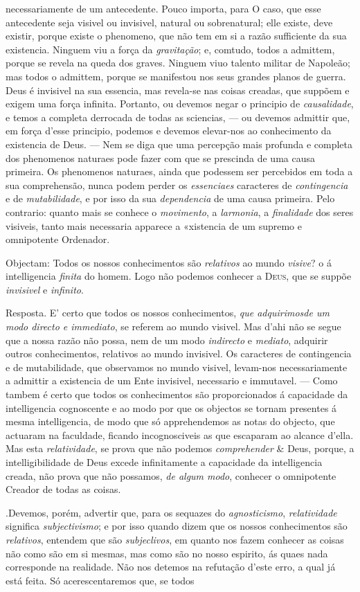 necessariamente de um antecedente. Pouco importa, para O caso, que esse antecedente seja visivel ou invisivel, natural ou sobrenatural; elle existe, deve existir, porque existe o phenomeno, que não tem em si a razão sufficiente da sua existencia. Ninguem viu a força da \emph{gravitação}; e, comtudo, todos a admittem, porque se revela na queda dos graves. Ninguem viuo talento militar de Napoleão; mas todos o admittem, porque se manifestou nos seus grandes planos de guerra. Deus é invisivel na sua essencia, mas revela-se nas coisas creadas, que suppõem e exigem uma força infinita. Portanto, ou devemos negar o principio de \emph{causalidade}, e temos a completa derrocada de todas as sciencias, --- ou devemos admittir que, em força d'esse principio, podemos e devemos elevar-nos ao conhecimento da existencia de Deus. --- Nem se diga que uma percepção mais profunda e completa dos phenomenos naturaes pode fazer com que se prescinda de uma causa primeira. Os phenomenos naturaes, ainda que podessem ser percebidos em toda a sua comprehensão, nunca podem perder os \emph{essenciaes} caracteres de \emph{contingencia} e de \emph{mutabilidade}, e por isso da sua \emph{dependencia} de uma causa primeira. Pelo contrario: quanto mais se conhece o \emph{movimento}, a \emph{larmonia}, a \emph{finalidade} dos seres visiveis, tanto mais necessaria apparece a «xistencia de um supremo e omnipotente Ordenador.\par Objectam: Todos os nossos conhecimentos são \emph{relativos} ao mundo \emph{visive}? o á intelligencia \emph{finita} do homem. Logo não podemos conhecer a \textsc{Deus}, que se suppõe \emph{invisivel} e \emph{infinito}.\par Resposta. E' certo que todos os nossos conhecimentos, \emph{que adquirimos}\emph{de um modo directo e immediato}, se referem ao mundo visivel. Mas d'ahi não se segue que a nossa razão não possa, nem de um modo \emph{indirecto} e \emph{mediato}, adquirir outros conhecimentos, relativos ao mundo invisivel. Os caracteres de contingencia e de mutabilidade, que observamos no mundo visivel, levam-nos necessariamente a admittir a existencia de um Ente invisivel, necessario e immutavel. --- Como tambem é certo que todos os conhecimentos são proporcionados á capacidade da intelligencia cognoscente e ao modo por que os objectos se tornam presentes á mesma intelligencia, de modo que só apprehendemos as notas do objecto, que actuaram na faculdade, ficando incognosciveis as que escaparam ao alcance d'ella. Mas esta \emph{relatividade}, se prova que não podemos \emph{comprehender} \& Deus, porque, a intelligibilidade de Deus excede infinitamente a capacidade da intelligencia creada, não prova que não possamos, \emph{de algum modo}, conhecer o omnipotente Creador de todas as coisas.\par .Devemos, porém, advertir que, para os sequazes do \emph{agnosticismo}, \emph{relatividade} significa \emph{subjectivismo}; e por isso quando dizem que os nossos conhecimentos são \emph{relativos}, entendem que são \emph{subjeclivos}, em quanto nos fazem conhecer as coisas não como são em si mesmas, mas como são no nosso espirito, ás quaes nada corresponde na realidade. Não nos detemos na refutação d'este erro, a qual já está feita. Só acerescentaremos que, se todos 